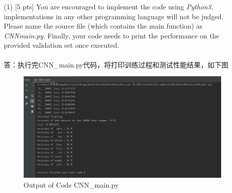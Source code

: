\documentclass{article}
\begin{document}
	\begin{enumerate}
		    \item[(1)] [5 pts] You are encouraged to implement the code using \emph{Python3}, implementations in any other programming language will not be judged. Please name the source file (which contains the main function) as \emph{CNN\underline{\hspace{0.5em}}main.py}. Finally, your code needs to print the performance on the provided validation set once executed.
\\\\答：执行完CNN\_main.py代码，将打印训练过程和测试性能结果，如下图\\
		\begin{figure}[htbp]
			\centering
			\includegraphics[scale=0.5]{Output_3_1.png}
			\caption{Output of Code CNN\_main.py}
		\end{figure}


\end{enumerate}
\end{document}
